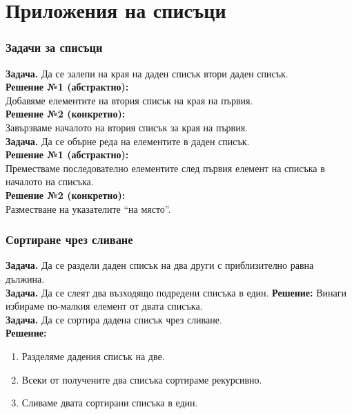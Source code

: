 \documentclass{beamer}
\begin{document}
\section{Приложения на списъци}

\begin{frame}
  \frametitle{Задачи за списъци}

  \textbf{Задача.} Да се залепи на края на даден списък втори даден списък.\\[1em]
  \pause
  \textbf{Решение №1 (абстрактно):} \\
  Добавяме елементите на втория списък на края на първия.\\[1em]
  \pause
  \textbf{Решение №2 (конкретно):} \\
  Завързваме началото на втория списък за края на първия.\\[1em]
  \pause\pause
  \textbf{Задача.} Да се обърне реда на елементите в даден списък.\\[1em]
  \pause
  \textbf{Решение №1 (абстрактно):}\\
  Преместваме последователно елементите след първия елемент на списъка в началото на списъка.\\[1em]
  \pause
  \textbf{Решение №2 (конкретно):}\\
  Разместване на указателите ``на място''.
\end{frame}

\begin{frame}
  \frametitle{Сортиране чрез сливане}

  \textbf{Задача.} Да се раздели даден списък на два други с приблизително равна дължина.\\[1em]
  \pause
  \textbf{Задача.} Да се слеят два възходящо подредени списъка в един.
  \pause
  \textbf{Решение:} Винаги избираме по-малкия елемент от двата списъка.\\[1em]
  \pause
  \textbf{Задача.} Да се сортира дадена списък чрез сливане.\\
  \pause
  \textbf{Решение:}
  \begin{enumerate}
  \item Разделяме дадения списък на две.
  \item Всеки от получените два списъка сортираме рекурсивно.
  \item Сливаме двата сортирани списъка в един.
  \end{enumerate}
\end{frame}
\end{document}
